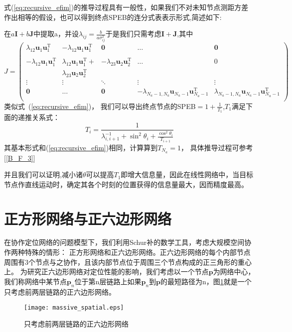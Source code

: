 式(\ref{eq:recursive_efim})的推导过程具有一般性，如果我们不对未知节点测距方差作出相等的假设，也可以得到终点SPEB的连分式表表示形式,简述如下:

在$a\bm{I}+b\bm{J}$中提取a，并设$\lambda_{ij}=\frac{b}{a\sigma_{ij}^2}$于是我们只需考虑$\bm{I}+\bm{J}$,其中
\[J=\left(
\begin{array}{ccccc}
\lambda_{12}\bm{u}_1\bm{u}_1^{\textrm{T}} &-\lambda_{12}\bm{u}_1\bm{u}_1^{\textrm{T}} &\bm{0}&\dots&\bm{0}\\
&&&&\\
-\lambda_{12}\bm{u}_1\bm{u}_1^{\textrm{T}} &\lambda_{12}\bm{u}_1\bm{u}_1^{\textrm{T}} +&-\lambda_{23}\bm{u}_2\bm{u}_2^{\textrm{T}} &\dots&0\\
&\lambda_{23}\bm{u}_2\bm{u}_2^{\textrm{T}} &&&\\
\vdots &\vdots&\ddots &\vdots&\vdots\\
\bm{0}&\dots&\bm{0}&-\lambda_{N_a-1,N_a}\bm{u}_{N_a-1}\bm{u}_{N_a-1}^{\textrm{T}} &\lambda_{N_a-1,N_a}\bm{u}_{N_a-1}\bm{u}_{N_a-1}^{\textrm{T}} \\
\end{array}
\right)
\]
类似式~(\ref{eq:recursive_efim})，
我们可以导出终点节点的SPEB$=1+\frac{1}{T_1}$,$T_1$满足下面的递推关系式：
\begin{equation}\label{eq:recursive_efim_second}
  T_i=\frac{1}{\lambda_{i,i+1}^{-1}+\sin^2\theta_i+\frac{\cos^2\theta_i}{T_{i+1}}}
\end{equation}
其基本形式和(\ref{eq:recursive_efim})相同，计算算到$T_{N_a}=1$，
具体推导过程可参考[\ref{B_F_3}]

并且我们可以证明,减小诸$\theta$可以提高$T_1$即增大信息量，因此在线性网络中，当目标节点作直线运动时，确定其各个时刻的位置获得的信息量最大，因而精度最高。
\section{正方形网络与正六边形网络}\label{section:square_and_hexagon_network}
在协作定位网络的问题模型下，我们利用Schur补的数学工具，考虑大规模空间协作两种特殊的情形：
正方形网络和正六边形网络。正六边形网络的每个内部节点周围有3个节点与之协作，且该内部节点位于周围三个节点构成的正三角形的重心上。
为研究正六边形网络对定位性能的影响，我们考虑以一个节点$\bm{p}$为网络中心，我们称网络中某节点$\bm{p}_n$位于第n层链路上如果$\bm{p}_n$到$\bm{p}$的最短路径为n，图\ref{HexagonNetwork}就是一个只考虑前两层链路的正六边形网络。
\begin{figure}[h]
  \centering
  \texttt{[image: massive\_spatial.eps]}
  \caption{只考虑前两层链路的正六边形网络}\label{HexagonNetwork}
\end{figure}

